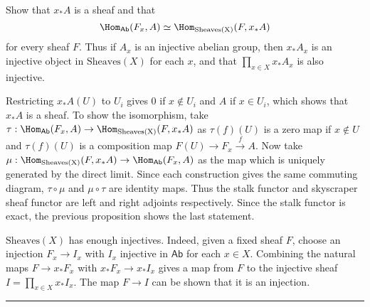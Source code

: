 \begin{exer} Show that $x_*A$ is a sheaf and that
\begin{equation}
\Hom_{\mathsf{Ab}}(F_x,A)\simeq \Hom_{\textrm{Sheaves(X)}}(F,x_* A)
\end{equation}
for every sheaf $F$. Thus if $A_x$ is an injective abelian group, then $x_* A_x$ is an injective object in $\textrm{Sheaves}(X)$ for each $x$, and that $\prod_{x\in X} x_* A_x$ is also injective.
\end{exer}
\begin{solution} Restricting $x_*A(U)$ to $U_i$ gives $0$ if $x\notin U_i$ and $A$ if $x\in U_i$, which shows that $x_*A$ is a sheaf. To show the isomorphism, take $\tau:\Hom_{\mathsf{Ab}}(F_x,A)\rightarrow \Hom_{\textrm{Sheaves(X)}}(F,x_* A)$ as $\tau(f)(U)$ is a zero map if $x\notin U$ and $\tau(f)(U)$ is a composition map $F(U)\rightarrow F_x\xrightarrow{f} A$. Now take $\mu:\Hom_{\textrm{Sheaves(X)}}(F,x_* A)\rightarrow \Hom_{\mathsf{Ab}}(F_x,A)$ as the map which is uniquely generated by the direct limit. Since each construction gives the same commuting diagram, $\tau\circ \mu$ and $\mu\circ \tau$ are identity maps. Thus the stalk functor and skyscraper sheaf functor are left and right adjoints respectively. Since the stalk functor is exact, the previous proposition shows the last statement.
\end{solution}

\begin{exmp} $\textrm{Sheaves}(X)$ has enough injectives. Indeed, given a fixed sheaf $F$, choose an injection $F_x\rightarrow I_x$ with $I_x$ injective in $\mathsf{Ab}$ for each $x\in X$. Combining the natural maps $F\rightarrow x_* F_x$ with $x_* F_x\rightarrow x_* I_x$ gives a map from $F$ to the injective sheaf $I=\prod_{x\in X}x_* I_x$. The map $F\rightarrow I$ can be shown that it is an injection.
\end{exmp}


\noindent\rule{\textwidth}{1pt}
\newline
